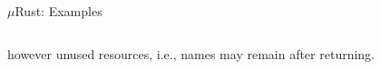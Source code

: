 \documentclass{beamer}
\newcommand{\gap}{\;\;}
\begin{document}
\begin{frame}{$\mu$Rust: Examples}
\begin{small}
\begin{columns}[T,onlytextwidth]
  \end{columns}
  \end{small}\vspace{0.5cm}
  \hspace{-0.2cm}however unused resources, i.e., names may remain after returning.
\end{frame}
\end{document}
